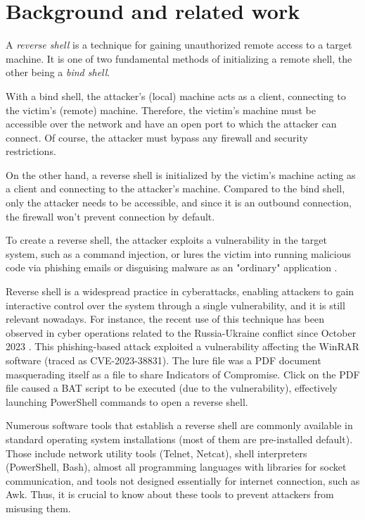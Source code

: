 \chapter{Background and related work}

\label{chap:background}


A \textit{reverse shell} is a technique for gaining unauthorized remote access to a target machine. It is one of two fundamental methods of initializing a remote shell, the other being a \textit{bind shell}.

With a bind shell, the attacker's (local) machine acts as a client, connecting to the victim's (remote) machine. Therefore, the victim's machine must be accessible over the network and have an open port to which the attacker can connect. Of course, the attacker must bypass any firewall and security restrictions.

On the other hand, a reverse shell is initialized by the victim's machine acting as a client and connecting to the attacker's machine. Compared to the bind shell, only the attacker needs to be accessible, and since it is an outbound connection, the firewall won't prevent connection by default.

To create a reverse shell, the attacker exploits a vulnerability in the target system, such as a command injection, or lures the victim into running malicious code via phishing emails or disguising malware as an "ordinary" application \cite{imperva}.

Reverse shell is a widespread practice in cyberattacks, enabling attackers to gain interactive control over the system through a single vulnerability, and it is still relevant nowadays. For instance, the recent use of this technique has been observed in cyber operations related to the Russia-Ukraine conflict since October 2023 \cite{cluster25}. This phishing-based attack exploited a vulnerability affecting the WinRAR software (traced as CVE-2023-38831). The lure file was a PDF document masquerading itself as a file to share Indicators of Compromise. Click on the PDF file caused a BAT script to be executed (due to the vulnerability), effectively launching PowerShell commands to open a reverse shell.

Numerous software tools that establish a reverse shell are commonly available in standard operating system installations (most of them are pre-installed default). Those include network utility tools (Telnet, Netcat), shell interpreters (PowerShell, Bash), almost all programming languages with libraries for socket communication, and tools not designed essentially for internet connection, such as Awk. Thus, it is crucial to know about these tools to prevent attackers from misusing them.

